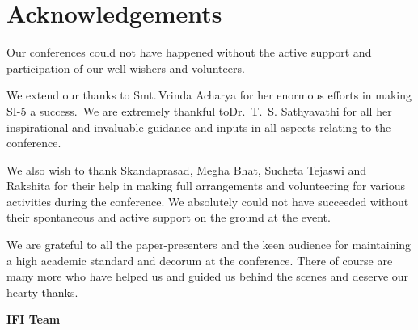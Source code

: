 
\chapter*{Acknowledgements}\label{ack}

Our conferences could not have happened without the active support and participation of our well-wishers and volunteers.

We extend our thanks to Smt.\,Vrinda Acharya for her enormous efforts in making SI-5 a success.~We are extremely thankful to\break Dr.~T.~S. Sathyavathi for all her inspirational and invaluable guidance and inputs in all aspects relating to the conference.

We also wish to thank Skandaprasad, Megha Bhat, Sucheta Tejaswi and Rakshita for their help in making full arrangements and volunteering for various activities during the conference. We absolutely could not have succeeded without their spontaneous and active support on the ground at the event.

We are grateful to all the paper-presenters and the keen audience for maintaining a high academic standard and decorum at the conference. There of course are many more who have helped us and guided us behind the scenes and deserve our hearty thanks.

\begin{flushright}
\textbf{IFI Team}
\end{flushright}

